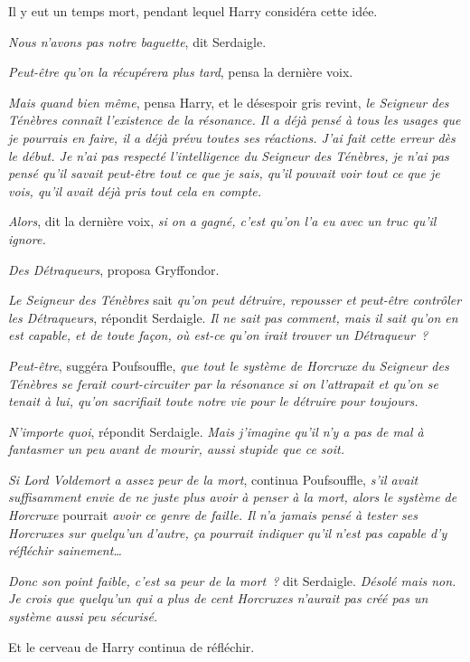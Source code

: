 Il y eut un temps mort, pendant lequel Harry considéra cette idée.

\emph{Nous n'avons pas notre baguette}, dit Serdaigle.

\emph{Peut-être qu'on la récupérera plus tard}, pensa la dernière voix.

\emph{Mais quand bien même}, pensa Harry, et le désespoir gris revint, \emph{le Seigneur des Ténèbres connaît l'existence de la résonance.
Il a déjà pensé à tous les usages que je pourrais en faire, il a déjà prévu toutes ses réactions.
J'ai fait cette erreur dès le début.
Je n'ai pas respecté l'intelligence du Seigneur des Ténèbres, je n'ai pas pensé qu'il savait peut-être tout ce que je sais, qu'il pouvait voir tout ce que je vois, qu'il avait déjà pris tout cela en compte.}

\emph{Alors}, dit la dernière voix, \emph{si on a gagné, c'est qu'on l'a eu avec un truc qu'il ignore.}

\emph{Des Détraqueurs}, proposa Gryffondor.

\emph{Le Seigneur des Ténèbres} sait \emph{qu'on peut détruire, repousser et peut-être contrôler les Détraqueurs}, répondit Serdaigle.
\emph{Il ne sait pas comment, mais il sait qu'on en est capable, et de toute façon, où est-ce qu'on irait trouver un Détraqueur~?}

\emph{Peut-être}, suggéra Poufsouffle, \emph{que tout le système de Horcruxe du Seigneur des Ténèbres se ferait court-circuiter par la résonance si on l'attrapait et qu'on se tenait à lui, qu'on sacrifiait toute notre vie pour le détruire pour toujours.}

\emph{N'importe quoi}, répondit Serdaigle.
\emph{Mais j'imagine qu'il n'y a pas de mal à fantasmer un peu avant de mourir, aussi stupide que ce soit.}

\emph{Si Lord Voldemort a assez peur de la mort}, continua Poufsouffle, \emph{s'il avait suffisamment envie de ne juste plus avoir à penser à la mort, alors le système de Horcruxe} pourrait \emph{avoir ce genre de faille.
Il n'a jamais pensé à tester ses Horcruxes sur quelqu'un d'autre, ça pourrait indiquer qu'il n'est pas capable d'y réfléchir sainement…}

\emph{Donc son point faible, c'est sa peur de la mort~?} dit Serdaigle.
\emph{Désolé mais non.
Je crois que quelqu'un qui a plus de cent Horcruxes n'aurait pas créé pas un système aussi peu sécurisé.}

Et le cerveau de Harry continua de réfléchir.

